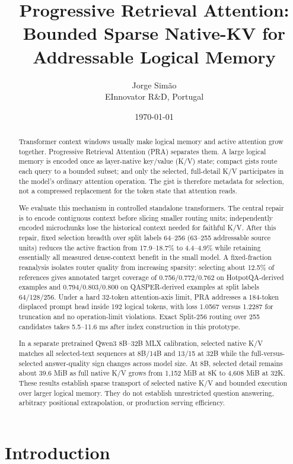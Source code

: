 \documentclass[11pt]{article}
\title{Progressive Retrieval Attention: Bounded Sparse Native-KV for Addressable Logical Memory}
\author{Jorge Sim\~ao\\EInnovator R\&D, Portugal}
\date{\today}
\begin{document}
\maketitle

\begin{abstract}
Transformer context windows usually make logical memory and active attention grow
together. Progressive Retrieval Attention (PRA) separates them. A large logical memory
is encoded once as layer-native key/value (K/V) state; compact gists route each query to
a bounded subset; and only the selected, full-detail K/V participates in the model's
ordinary attention operation. The gist is therefore metadata for selection, not a
compressed replacement for the token state that attention reads.

We evaluate this mechanism in controlled standalone transformers. The central repair is to
encode contiguous context before slicing smaller routing units; independently encoded
microchunks lose the historical context needed for faithful K/V. After this repair, fixed
selection breadth over split labels 64--256 (63--255 addressable source units) reduces the active fraction from 17.9--18.7\% to
4.4--4.9\% while retaining essentially all measured dense-context benefit in the small
model. A fixed-fraction reanalysis isolates router quality from increasing sparsity:
selecting about 12.5\% of references gives annotated target coverage of
0.756/0.772/0.762 on HotpotQA-derived examples and 0.794/0.803/0.800 on
QASPER-derived examples at split labels 64/128/256. Under a hard 32-token attention-axis
limit, PRA addresses a 184-token displaced prompt head inside 192 logical tokens, with
loss 1.0567 versus 1.2287 for truncation and no operation-limit violations. Exact
Split-256 routing over 255 candidates takes 5.5--11.6 ms after index construction in this prototype.

In a separate pretrained Qwen3 8B--32B MLX calibration, selected native K/V
matches all selected-text sequences at 8B/14B and 13/15 at 32B while the full-versus-selected answer-quality
sign changes across model size. At 8B, selected detail remains about 39.6 MiB
as full native K/V grows from 1,152 MiB at 8K to 4,608 MiB at 32K.
These results establish sparse transport of selected native K/V and bounded execution
over larger logical memory. They do not establish unrestricted question answering,
arbitrary positional extrapolation, or production serving efficiency.
\end{abstract}

\section{Introduction}
\end{document}
